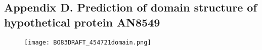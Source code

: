 \documentclass[a4paper,10pt]{article}
\begin{document}
\begin{appendices}
\section*{Appendix D. Prediction of domain structure of hypothetical protein AN8549\cite{paysan2023interpro}}\label{secD}

\begin{figure}[H]
\centering
\texttt{[image: BO83DRAFT\_454721domain.png]}
\end{figure}

\end{appendices}
\fi
\end{document}

